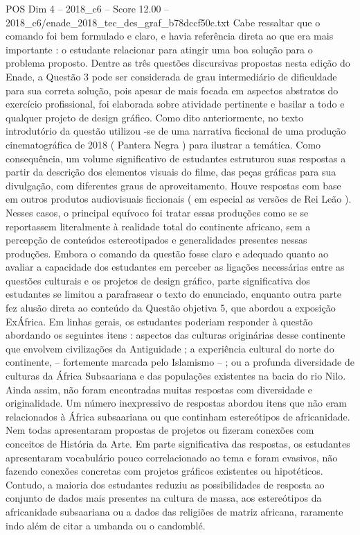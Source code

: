 \begin{textsample}{POS Dim 4 – 2018\_c6 – Score 12.00 – 2018\_c6/enade\_2018\_tec\_des\_graf\_b78dccf50c.txt}
Cabe ressaltar que o comando foi bem formulado e claro, e havia referência direta ao que era mais importante : o estudante relacionar para atingir uma boa solução para o problema proposto.
Dentre as três questões discursivas propostas nesta edição do Enade, a Questão 3 pode ser considerada de grau intermediário de dificuldade para sua correta solução, pois apesar de mais focada em aspectos abstratos do exercício profissional, foi elaborada sobre atividade pertinente e basilar a todo e qualquer projeto de design gráfico.
Como dito anteriormente, no texto introdutório da questão utilizou -se de uma narrativa ficcional de uma produção cinematográfica de 2018 ( Pantera Negra ) para ilustrar a temática.
Como consequência, um volume significativo de estudantes estruturou suas respostas a partir da descrição dos elementos visuais do filme, das peças gráficas para sua divulgação, com diferentes graus de aproveitamento.
Houve respostas com base em outros produtos audiovisuais ficcionais ( em especial as versões de Rei Leão ).
Nesses casos, o principal equívoco foi tratar essas produções como se se reportassem literalmente à realidade total do continente africano, sem a percepção de conteúdos estereotipados e generalidades presentes nessas produções.
Embora o comando da questão fosse claro e adequado quanto ao avaliar a capacidade dos estudantes em perceber as ligações necessárias entre as questões culturais e os projetos de design gráfico, parte significativa dos estudantes se limitou a parafrasear o texto do enunciado, enquanto outra parte fez alusão direta ao conteúdo da Questão objetiva 5, que abordou a exposição ExÁfrica.
Em linhas gerais, os estudantes poderiam responder à questão abordando os seguintes itens : aspectos das culturas originárias desse continente que envolvem civilizações da Antiguidade ; a experiência cultural do norte do continente, – fortemente marcada pelo Islamismo – ; ou a profunda diversidade de culturas da África Subsaariana e das populações existentes na bacia do rio Nilo.
Ainda assim, não foram encontradas muitas respostas com diversidade e originalidade.
Um número inexpressivo de respostas abordou itens que não eram relacionados à África subsaariana ou que continham estereótipos de africanidade.
Nem todas apresentaram propostas de projetos ou fizeram conexões com conceitos de História da Arte.
Em parte significativa das respostas, os estudantes apresentaram vocabulário pouco correlacionado ao tema e foram evasivos, não fazendo conexões concretas com projetos gráficos existentes ou hipotéticos.
Contudo, a maioria dos estudantes reduziu as possibilidades de resposta ao conjunto de dados mais presentes na cultura de massa, aos estereótipos da africanidade subsaariana ou a dados das religiões de matriz africana, raramente indo além de citar a umbanda ou o candomblé.

\end{textsample}
